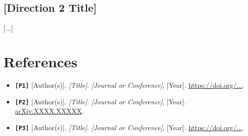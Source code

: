 \documentclass[10pt]{article}
\newcommand{\papercode}[1]{\textcolor{papergreen}{\texttt{[#1]}}}
\newcommand{\papercodehead}[1]{\textbf{\papercode{#1}}}
\begin{document}
\subsection{[Direction 2 Title]}

[...]

\section*{References}

\begin{itemize}[leftmargin=*]

\item {}\label{paper:P1_ref}\papercodehead{P1}
[Author(s)].
\emph{[Title]}.
\emph{[Journal or Conference]}, [Year].
\href{https://doi.org/...}{https://doi.org/...}.

\item {}\label{paper:P2_ref}\papercodehead{P2}
[Author(s)].
\emph{[Title]}.
\emph{[Journal or Conference]}, [Year].
\href{https://arxiv.org/abs/...}{arXiv:XXXX.XXXXX}.

\item {}\label{paper:P3_ref}\papercodehead{P3}
[Author(s)].
\emph{[Title]}.
\emph{[Journal or Conference]}, [Year].
\href{https://doi.org/...}{https://doi.org/...}.

\end{itemize}
\end{document}
